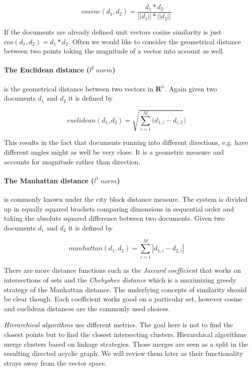     \begin{equation}
      cosine(d_1, d_2) = \frac{d_1 * d_2}{||d_1|| * ||d_2||}
    \end{equation}

    If the documents are already defined unit vectors cosine similarity is just $cos(d_1, d_2) = d_1 * d_2$. Often we would like to consider the geometrical distance between two points taking the magnitude of a vector into account as well.

    \paragraph{The Euclidean distance ($l^2\:norm$)} is the geometrical distance between two vectors in $\mathbf{R}^n$. Again given two documents $d_1$ and $d_2$ it is defined by

    \begin{equation}
      euclidean(d_1, d_2) = \sqrt{\sum_{i=1}^{M}(d_{1,i} - d_{i, 2}})
    \end{equation}

    This results in the fact that documents running into different directions, e.g. have different angles might as well be very close. It is a geometric measure and accounts for magnitude rather than direction.

    \paragraph{The Manhattan distance ($l^1\:norm$)} is commonly known under the city block distance measure. The system is divided up in equally squared brackets comparing dimensions in sequential order and taking the absolute squared difference between two documents. Given two documents $d_1$ and $d_2$ it is defined by

    \begin{equation}
      manhattan(d_1, d_2) = \sum_{i=1}^{M}|d_{1,i} - d_{2,i}|
    \end{equation}

    There are more distance functions such as the \emph{Jaccard coefficient} that works on intersections of sets and the \emph{Chebyshev distance} which is a maximizing greedy strategy of the Manhattan distance. The underlying concepts of similarity should be clear though. Each coefficient works good on a particular set, however cosine and euclidean distances are the commonly used choices.

    \emph{Hierarchical algorithms} use different metrics. The goal here is not to find the closest points but to find the closest intersecting clusters. Hierarchical algorithms merge clusters based on linkage strategies. Those merges are seen as a split in the resulting directed acyclic graph. We will review them later as their functionality strays away from the vector space.

